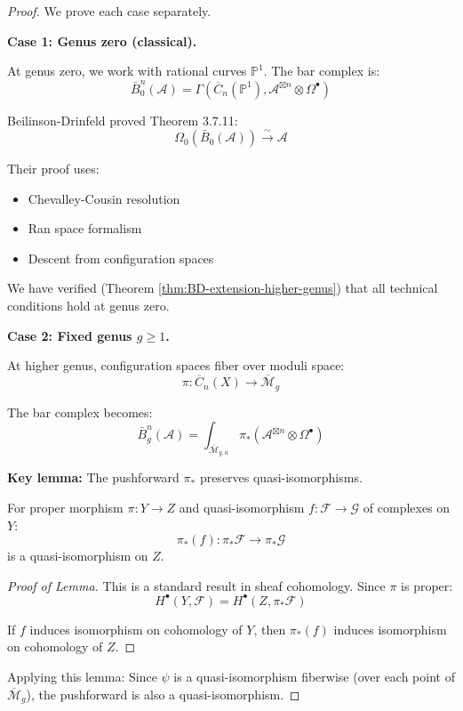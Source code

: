 \begin{proof}
We prove each case separately.

\textbf{Case 1: Genus zero (classical).}

At genus zero, we work with rational curves $\mathbb{P}^1$. The bar complex is:
$$\bar{B}_0^n(\mathcal{A}) = \Gamma\left(\overline{C}_n(\mathbb{P}^1), 
\mathcal{A}^{\boxtimes n} \otimes \Omega^\bullet\right)$$

Beilinson-Drinfeld proved \cite{BD04} Theorem 3.7.11:
$$\Omega_0(\bar{B}_0(\mathcal{A})) \xrightarrow{\sim} \mathcal{A}$$

Their proof uses:
\begin{itemize}
\item Chevalley-Cousin resolution
\item Ran space formalism
\item Descent from configuration spaces
\end{itemize}

We have verified (Theorem \ref{thm:BD-extension-higher-genus}) that all technical 
conditions hold at genus zero.

\textbf{Case 2: Fixed genus $g \geq 1$.}

At higher genus, configuration spaces fiber over moduli space:
$$\pi: \overline{C}_n(X) \to \overline{\mathcal{M}}_g$$

The bar complex becomes:
$$\bar{B}_g^n(\mathcal{A}) = \int_{\overline{\mathcal{M}}_{g,n}} 
\pi_*\left(\mathcal{A}^{\boxtimes n} \otimes \Omega^\bullet\right)$$

\textbf{Key lemma:} The pushforward $\pi_*$ preserves quasi-isomorphisms.

\begin{lemma}\label{lem:pushforward-preserves-qi}
For proper morphism $\pi: Y \to Z$ and quasi-isomorphism $f: \mathcal{F} \to \mathcal{G}$ 
of complexes on $Y$:
$$\pi_*(f): \pi_*\mathcal{F} \to \pi_*\mathcal{G}$$
is a quasi-isomorphism on $Z$.
\end{lemma}

\begin{proof}[Proof of Lemma]
This is a standard result in sheaf cohomology. Since $\pi$ is proper:
$$H^\bullet(Y, \mathcal{F}) = H^\bullet(Z, \pi_*\mathcal{F})$$

If $f$ induces isomorphism on cohomology of $Y$, then $\pi_*(f)$ induces 
isomorphism on cohomology of $Z$.
\end{proof}

Applying this lemma: Since $\psi$ is a quasi-isomorphism fiberwise (over each 
point of $\overline{\mathcal{M}}_g$), the pushforward is also a quasi-isomorphism.


\end{proof}
